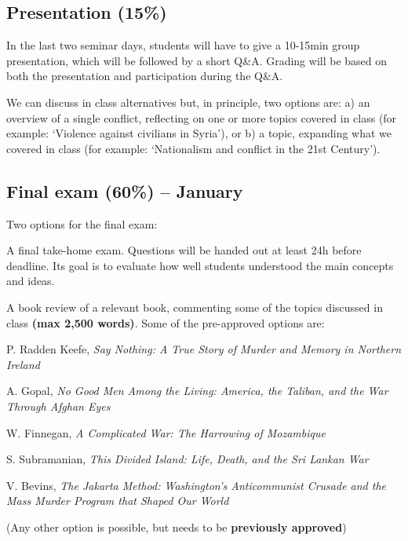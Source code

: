 \documentclass[12pt, a4paper]{article}
\begin{document}

\subsection*{Presentation (15\%)}

In the last two seminar days, students will have to give a 10-15min group presentation, which will be followed by a short Q\&A. Grading will be based on both the presentation and participation during the Q\&A.

We can discuss in class alternatives but, in principle, two options are: a) an overview of a single conflict, reflecting on one or more topics covered in class (for example: `Violence against civilians in Syria'), or b) a topic, expanding what we covered in class (for example: `Nationalism and conflict in the 21st Century').

\subsection*{Final exam (60\%) -- January}

Two options for the final exam:

\begin{itemize}
  \item[1.] A final take-home exam. Questions will be handed out at least 24h before deadline. Its goal is to evaluate how well students understood the main concepts and ideas.
  \item[2.] A book review of a relevant book, commenting some of the topics discussed in class \textbf{(max 2,500 words)}. Some of the pre-approved options are:
  {\small
  \item[-] P. Radden Keefe, \textit{Say Nothing: A True Story of Murder and Memory in Northern Ireland} \vspace{-10pt}
  \item[-] A. Gopal, \textit{No Good Men Among the Living: America, the Taliban, and the War Through Afghan Eyes} \vspace{-10pt}
  \item[-] W. Finnegan, \textit{A Complicated War: The Harrowing of Mozambique} \vspace{-10pt}
  \item[-] S. Subramanian, \textit{This Divided Island: Life, Death, and the Sri Lankan War} \vspace{-10pt}
  \item[-] V. Bevins, \textit{The Jakarta Method: Washington's Anticommunist Crusade and the Mass Murder Program that Shaped Our World}
  }
  \item[] (Any other option is possible, but needs to be \textbf{previously approved})
\end{itemize}
\end{document}
